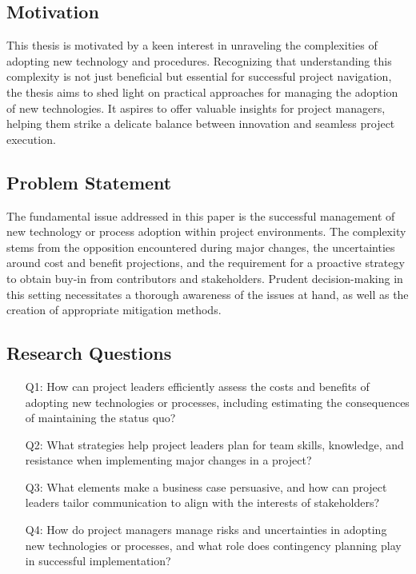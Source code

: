 \documentclass{article}
\begin{document}
\subsection{Motivation}
This thesis is motivated by a keen interest in unraveling the complexities of adopting new technology and procedures. Recognizing that understanding this complexity is not just beneficial but essential for successful project navigation, the thesis aims to shed light on practical approaches for managing the adoption of new technologies. It aspires to offer valuable insights for project managers, helping them strike a delicate balance between innovation and seamless project execution.

\subsection{Problem Statement}
The fundamental issue addressed in this paper is the successful management of new technology or process adoption within project environments. The complexity stems from the opposition encountered during major changes, the uncertainties around cost and benefit projections, and the requirement for a proactive strategy to obtain buy-in from contributors and stakeholders. Prudent decision-making in this setting necessitates a thorough awareness of the issues at hand, as well as the creation of appropriate mitigation methods.

\subsection{Research Questions}
\begin{enumerate}
    \item[Q1:] How can project leaders efficiently assess the costs and benefits of adopting new technologies or processes, including estimating the consequences of maintaining the status quo?
    
    \item[Q2:] What strategies help project leaders plan for team skills, knowledge, and resistance when implementing major changes in a project?
    
    \item[Q3:] What elements make a business case persuasive, and how can project leaders tailor communication to align with the interests of stakeholders?
    
    \item[Q4:] How do project managers manage risks and uncertainties in adopting new technologies or processes, and what role does contingency planning play in successful implementation?
\end{enumerate}
\end{document}
